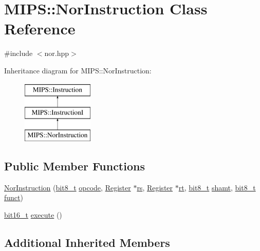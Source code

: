 \hypertarget{classMIPS_1_1NorInstruction}{}\section{M\+I\+PS\+:\+:Nor\+Instruction Class Reference}
\label{classMIPS_1_1NorInstruction}


{\ttfamily \#include $<$nor.\+hpp$>$}

Inheritance diagram for M\+I\+PS\+:\+:Nor\+Instruction\+:\begin{figure}[H]
\begin{center}
\leavevmode
\includegraphics[height=3.000000cm]{classMIPS_1_1NorInstruction}
\end{center}
\end{figure}
\subsection*{Public Member Functions}
\begin{DoxyCompactItemize}
\item 
\hyperlink{classMIPS_1_1NorInstruction_a56d6fb7a2f54c446c06a8cba4b159d4f}{Nor\+Instruction} (\hyperlink{core_8hpp_a6074bae122ae7b527864eec42c728c3c}{bit8\+\_\+t} \hyperlink{classMIPS_1_1Instruction_a45cc6808b5dde8a5d41067d148b55476}{opcode}, \hyperlink{classMIPS_1_1Register}{Register} $\ast$\hyperlink{classMIPS_1_1InstructionI_a2be191d5b3dce505e2e626ec02eb4d62}{rs}, \hyperlink{classMIPS_1_1Register}{Register} $\ast$\hyperlink{classMIPS_1_1InstructionI_add1db07a5c954f35271de8c8a5737487}{rt}, \hyperlink{core_8hpp_a6074bae122ae7b527864eec42c728c3c}{bit8\+\_\+t} \hyperlink{classMIPS_1_1InstructionI_aa9b6da37c374c2ec8d96448d341e5e7d}{shamt}, \hyperlink{core_8hpp_a6074bae122ae7b527864eec42c728c3c}{bit8\+\_\+t} \hyperlink{classMIPS_1_1InstructionI_a5c6efcbbd233a7447c1fe24ea0a1e558}{funct})
\item 
\hyperlink{core_8hpp_adc265a970bc35995b5879784bbb3f1b7}{bit16\+\_\+t} \hyperlink{classMIPS_1_1NorInstruction_a68bb5cc9920bd63229f4c16c4edb5ab6}{execute} ()
\end{DoxyCompactItemize}
\subsection*{Additional Inherited Members}


